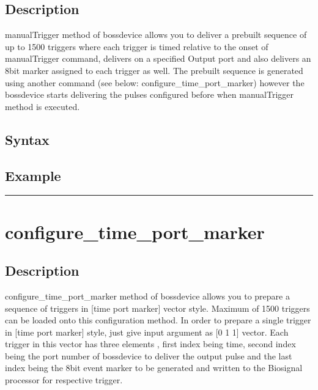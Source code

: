 \documentclass[letterpaper,10pt,english]{sphinxmanual}
\begin{document}
\subsection{Description}
\label{\detokenize{4_api_documentation:id4}}
manualTrigger method of bossdevice allows you to deliver a pre\sphinxhyphen{}built sequence of up to 1500 triggers where each trigger is timed relative to the onset of manualTrigger command, delivers on a specified Output port and also delivers an 8\sphinxhyphen{}bit marker assigned to each trigger as well.
The pre\sphinxhyphen{}built sequence is generated using another command (see below: configure\_time\_port\_marker) however the bossdevice starts delivering the pulses configured before when manualTrigger method is executed.


\subsection{Syntax}
\label{\detokenize{4_api_documentation:id5}}
\begin{sphinxVerbatim}[commandchars=\\\{\}]
 
\end{sphinxVerbatim}


\subsection{Example}
\label{\detokenize{4_api_documentation:id6}}
\begin{sphinxVerbatim}[commandchars=\\\{\}]
\end{sphinxVerbatim}


\bigskip\hrule\bigskip



\section{configure\_time\_port\_marker}
\label{\detokenize{4_api_documentation:configure-time-port-marker}}

\subsection{Description}
\label{\detokenize{4_api_documentation:id7}}
configure\_time\_port\_marker method of bossdevice allows you to prepare a sequence of triggers in {[}time port marker{]} vector style. Maximum of 1500 triggers can be loaded onto this configuration method. In order to prepare a single trigger in {[}time port marker{]} style, just give input argument as {[}0 1 1{]} vector.
Each trigger in this vector has three elements , first index being time, second index being the port number of bossdevice to deliver the output pulse and the last index being the 8\sphinxhyphen{}bit event marker to be generated and written to the Biosignal processor for respective trigger.
\end{document}

